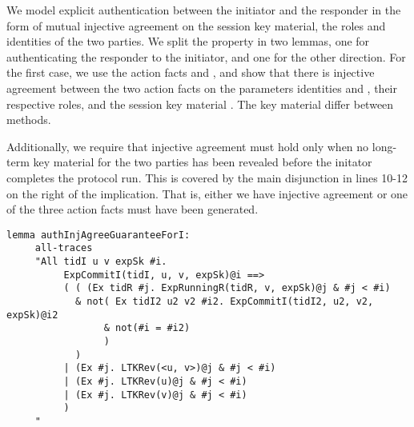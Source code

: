 We model explicit authentication between the initiator and the
responder in the form of mutual injective agreement on the session key material,
the roles and identities of the two parties.
%
We split the property in two lemmas, one for authenticating the responder to the
initiator, and one for the other direction.
%
For the first case, we use the action facts  and
, and show that there is injective agreement
between the two action facts on the parameters identities  and ,
their respective roles,  and the session key material .
%
The key material differ between \mEdhoc{} methods.
%

Additionally, we require that injective agreement must hold only when
no long-term key material for the two parties has been revealed before
the initator completes the protocol run.
%
This is covered by the main disjunction in lines 10-12 on the right of
the implication.
%
That is, either we have injective agreement or one of
the three  action facts must have been generated.
%


\begin{lstlisting}
lemma authInjAgreeGuaranteeForI:
     all-traces
     "All tidI u v expSk #i.
          ExpCommitI(tidI, u, v, expSk)@i ==>
          ( ( (Ex tidR #j. ExpRunningR(tidR, v, expSk)@j & #j < #i)
            & not( Ex tidI2 u2 v2 #i2. ExpCommitI(tidI2, u2, v2, expSk)@i2
                 & not(#i = #i2)
                 )
            )
          | (Ex #j. LTKRev(<u, v>)@j & #j < #i)
          | (Ex #j. LTKRev(u)@j & #j < #i)
          | (Ex #j. LTKRev(v)@j & #j < #i)
          )
     "
\end{lstlisting}

